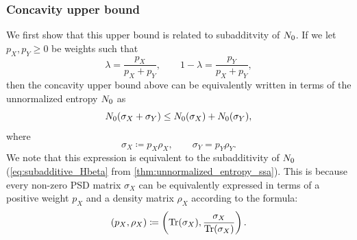 \documentclass[notitlepage, 10pt]{article}
\begin{document}
\subsubsection{Concavity upper bound}
We first show that this upper bound is related to subadditvity of $N_0$.
If we let $p_X, p_Y \geq 0$ be weights such that
\begin{equation}
    \label{eq:binary_weights}
    \lambda = \frac{p_{X}}{p_{X} + p_{Y}}, \qquad 1-\lambda = \frac{p_{Y}}{p_{X} + p_{Y}},
\end{equation}
then the concavity upper bound above can be equivalently written in terms of the unnormalized entropy $N_0$ as
\begin{equation}
    N_{0}(\sigma_X + \sigma_Y) \leq N_0(\sigma_X) + N_0(\sigma_Y),
\end{equation}
where
\begin{equation}
    \label{eq:normalization_scheme}
    \sigma_X \coloneqq p_X \rho_X, \qquad \sigma_Y = p_Y \rho_Y.
\end{equation}
We note that this expression is equivalent to the subadditivity of $N_0$ (\cref{eq:subadditive_Hbeta} from \cref{thm:unnormalized_entropy_ssa}).
This is because every non-zero PSD matrix $\sigma_X$ can be equivalently expressed in terms of a positive weight $p_X$ and a density matrix $\rho_X$ according to the formula:
\begin{equation}
    (p_X, \rho_X) \coloneqq \left(\operatorname{Tr}(\sigma_X), \frac{\sigma_X}{\operatorname{Tr}(\sigma_X)}\right).
\end{equation}
\end{document}
